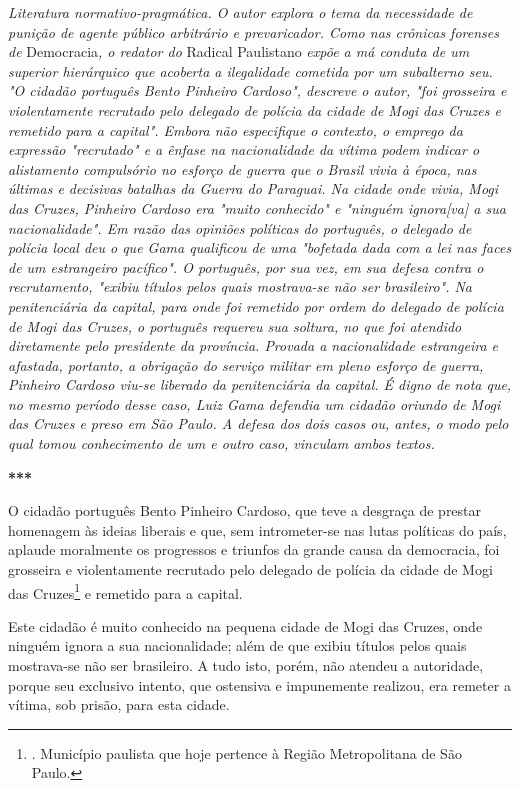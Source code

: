 \emph{Literatura normativo-pragmática. O autor explora o tema da
necessidade de punição de agente público arbitrário e prevaricador. Como
nas crônicas forenses de} Democracia\emph{, o redator do} Radical
Paulistano \emph{expõe a má conduta de um superior hierárquico que
acoberta a ilegalidade cometida por um subalterno seu. "O cidadão
português Bento Pinheiro Cardoso", descreve o autor, "foi grosseira e
violentamente recrutado pelo delegado de polícia da cidade de Mogi das
Cruzes e remetido para a capital". Embora não especifique o contexto, o
emprego da expressão "recrutado" e a ênfase na nacionalidade da vítima
podem indicar o alistamento compulsório no esforço de guerra que o
Brasil vivia à época, nas últimas e decisivas batalhas da Guerra do
Paraguai. Na cidade onde vivia, Mogi das Cruzes, Pinheiro Cardoso era
"muito conhecido" e "ninguém ignora{[}va{]} a sua nacionalidade". Em
razão das opiniões políticas do português, o delegado de polícia local
deu o que Gama qualificou de uma "bofetada dada com a lei nas faces de
um estrangeiro pacífico". O português, por sua vez, em sua defesa contra
o recrutamento, "exibiu títulos pelos quais mostrava-se não ser
brasileiro". Na penitenciária da capital, para onde foi remetido por
ordem do delegado de polícia de Mogi das Cruzes, o português requereu
sua soltura, no que foi atendido diretamente pelo presidente da
província. Provada a nacionalidade estrangeira e afastada, portanto, a
obrigação do serviço militar em pleno esforço de guerra, Pinheiro
Cardoso viu-se liberado da penitenciária da capital. É digno de nota
que, no mesmo período desse caso, Luiz Gama defendia um cidadão oriundo
de Mogi das Cruzes e preso em São Paulo. A defesa dos dois casos ou,
antes, o modo pelo qual tomou conhecimento de um e outro caso, vinculam
ambos textos.}

\textbf{***}

O cidadão português Bento Pinheiro Cardoso, que teve a desgraça de
prestar homenagem às ideias liberais e que, sem intrometer-se nas lutas
políticas do país, aplaude moralmente os progressos e triunfos da grande
causa da democracia, foi grosseira e violentamente recrutado pelo
delegado de polícia da cidade de Mogi das Cruzes\footnote{. Município
  paulista que hoje pertence à Região Metropolitana de São Paulo.} e
remetido para a capital.

Este cidadão é muito conhecido na pequena cidade de Mogi das Cruzes,
onde ninguém ignora a sua nacionalidade; além de que exibiu títulos
pelos quais mostrava-se não ser brasileiro. A tudo isto, porém, não
atendeu a autoridade, porque seu exclusivo intento, que ostensiva e
impunemente realizou, era remeter a vítima, sob prisão, para esta
cidade.

